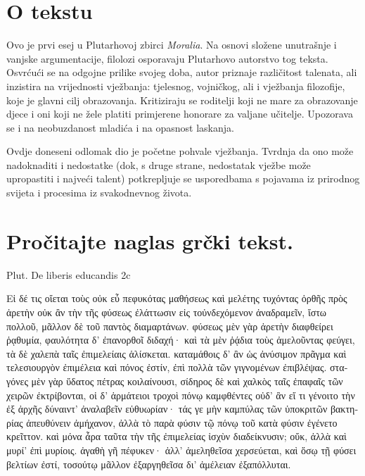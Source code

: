 


\section*{O tekstu}

Ovo je prvi esej u Plutarhovoj zbirci \textit{Moralia}. Na osnovi složene unutrašnje i vanjske argumentacije, filolozi osporavaju Plutarhovo autorstvo tog teksta. Osvrćući se na odgojne prilike svojeg doba, autor priznaje različitost talenata, ali inzistira na vrijednosti vježbanja: tjelesnog, vojničkog, ali i vježbanja filozofije, koje je glavni cilj obrazovanja. Kritiziraju se roditelji koji ne mare za obrazovanje djece i oni koji ne žele platiti primjerene honorare za valjane učitelje. Upozorava se i na neobuzdanost mladića i na opasnost laskanja.

Ovdje doneseni odlomak dio je početne pohvale vježbanja. Tvrdnja da ono može nadoknaditi i nedostatke (dok, s druge strane, nedostatak vježbe može upropastiti i najveći talent) potkrepljuje se usporedbama s pojavama iz prirodnog svijeta i procesima iz svakodnevnog života.


\section*{Pročitajte naglas grčki tekst.}
Plut. De liberis educandis 2c

\medskip

{\large
\begin{greek}
\noindent Εἰ δέ τις οἴεται τοὺς οὐκ εὖ πεφυκότας μαθήσεως καὶ μελέτης τυχόντας ὀρθῆς πρὸς ἀρετὴν οὐκ ἂν τὴν τῆς φύσεως ἐλάττωσιν εἰς τοὐνδεχόμενον ἀναδραμεῖν, ἴστω πολλοῦ, μᾶλλον δὲ τοῦ παντὸς διαμαρτάνων. φύσεως μὲν γὰρ ἀρετὴν διαφθείρει ῥᾳθυμία, φαυλότητα δ' ἐπανορθοῖ διδαχή· καὶ τὰ μὲν ῥᾴδια τοὺς ἀμελοῦντας φεύγει, τὰ δὲ χαλεπὰ ταῖς ἐπιμελείαις ἁλίσκεται. καταμάθοις δ' ἂν ὡς ἀνύσιμον πρᾶγμα καὶ τελεσιουργὸν ἐπιμέλεια καὶ πόνος ἐστίν, ἐπὶ πολλὰ τῶν γιγνομένων ἐπιβλέψας. σταγόνες μὲν γὰρ ὕδατος πέτρας κοιλαίνουσι, σίδηρος δὲ καὶ χαλκὸς ταῖς ἐπαφαῖς τῶν χειρῶν ἐκτρίβονται, οἱ δ' ἁρμάτειοι τροχοὶ πόνῳ καμφθέντες οὐδ' ἂν εἴ τι γένοιτο τὴν ἐξ ἀρχῆς δύναιντ' ἀναλαβεῖν εὐθυωρίαν· τάς γε μὴν καμπύλας τῶν ὑποκριτῶν βακτηρίας ἀπευθύνειν ἀμήχανον, ἀλλὰ τὸ παρὰ φύσιν τῷ πόνῳ τοῦ κατὰ φύσιν ἐγένετο κρεῖττον. καὶ μόνα ἆρα ταῦτα τὴν τῆς ἐπιμελείας ἰσχὺν διαδείκνυσιν; οὔκ, ἀλλὰ καὶ μυρί' ἐπὶ μυρίοις. ἀγαθὴ γῆ πέφυκεν· ἀλλ' ἀμεληθεῖσα χερσεύεται, καὶ ὅσῳ τῇ φύσει βελτίων ἐστί, τοσούτῳ μᾶλλον ἐξαργηθεῖσα δι' ἀμέλειαν ἐξαπόλλυται.

\end{greek}
}


